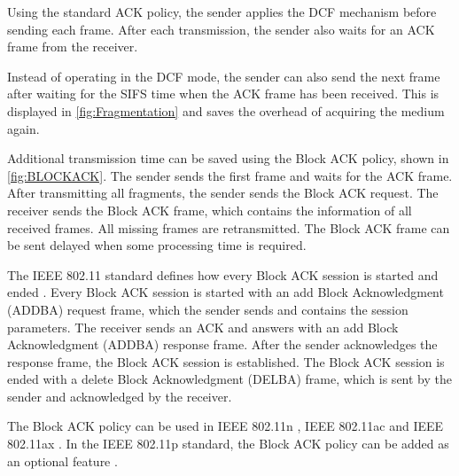 Using the standard \ac{ACK} policy, the sender applies the \ac{DCF} mechanism before sending each frame.
After each transmission, the sender also waits
for an \ac{ACK} frame from the receiver.

Instead of operating in the \ac{DCF} mode, the sender
can also send the next frame after waiting for the \ac{SIFS} time when the \ac{ACK} frame has been received.
This is displayed in \autoref{fig:Fragmentation} and saves the overhead of acquiring the medium again.

Additional transmission time can be saved using the Block \ac{ACK} policy, shown in \autoref{fig:BLOCKACK}.
The sender sends the first frame and waits for the \ac{ACK} frame.
After transmitting all fragments, the sender sends the Block \ac{ACK} request.
The receiver sends the Block \ac{ACK} frame, which contains the information of all received frames.
All missing frames are retransmitted.
The Block \ac{ACK} frame can be sent delayed when some processing time is required.

The IEEE 802.11 standard defines how every Block \ac{ACK} session is started and ended \cite{ieee_standard_2009n, ieee_standard_2021ax}.
Every Block \ac{ACK} session is started with an add Block Acknowledgment (ADDBA) request frame, which the sender sends and
contains the session parameters.
The receiver sends an \ac{ACK} and answers with an add Block Acknowledgment (ADDBA) response frame.
After the sender acknowledges the response frame, the Block \ac{ACK} session is established.
The Block \ac{ACK} session is ended with a delete Block Acknowledgment (DELBA) frame, which is sent by the sender and acknowledged by the receiver.

The Block \ac{ACK} policy can be used in IEEE 802.11n \cite{ieee_standard_2009n}, IEEE 802.11ac \cite{ieee_standard_2020} and IEEE 802.11ax \cite{ieee_standard_2021ax}.
In the IEEE 802.11p standard, the Block \ac{ACK} policy can be added as an optional feature \cite{ieee_standard_2010p}.

